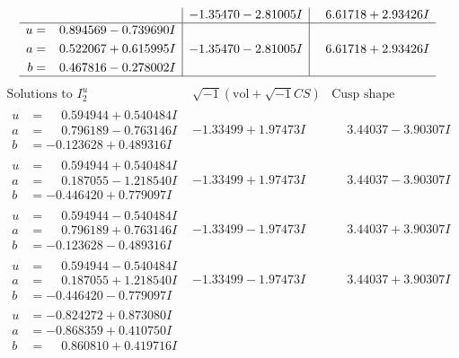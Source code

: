 \documentclass[1p]{elsarticle_modified}
\theoremstyle{definition}
\newcommand{\I}{\sqrt{-1}}
\begin{document}
$$\begin{array}{c|c|c}
 & -1.35470 - 2.81005 I & \phantom{-}6.61718 + 2.93426 I \\ \hline\begin{aligned}
u &= \phantom{-}0.894569 - 0.739690 I \\
a &= \phantom{-}0.522067 + 0.615995 I \\
b &= \phantom{-}0.467816 - 0.278002 I\end{aligned}
 & -1.35470 - 2.81005 I & \phantom{-}6.61718 + 2.93426 I\\
 \hline 
 \end{array}$$\newpage$$\begin{array}{c|c|c}  
\text{Solutions to }I^u_{2}& \I (\text{vol} + \sqrt{-1}CS) & \text{Cusp shape}\\
 \hline 
\begin{aligned}
u &= \phantom{-}0.594944 + 0.540484 I \\
a &= \phantom{-}0.796189 - 0.763146 I \\
b &= -0.123628 + 0.489316 I\end{aligned}
 & -1.33499 + 1.97473 I & \phantom{-}3.44037 - 3.90307 I \\ \hline\begin{aligned}
u &= \phantom{-}0.594944 + 0.540484 I \\
a &= \phantom{-}0.187055 - 1.218540 I \\
b &= -0.446420 + 0.779097 I\end{aligned}
 & -1.33499 + 1.97473 I & \phantom{-}3.44037 - 3.90307 I \\ \hline\begin{aligned}
u &= \phantom{-}0.594944 - 0.540484 I \\
a &= \phantom{-}0.796189 + 0.763146 I \\
b &= -0.123628 - 0.489316 I\end{aligned}
 & -1.33499 - 1.97473 I & \phantom{-}3.44037 + 3.90307 I \\ \hline\begin{aligned}
u &= \phantom{-}0.594944 - 0.540484 I \\
a &= \phantom{-}0.187055 + 1.218540 I \\
b &= -0.446420 - 0.779097 I\end{aligned}
 & -1.33499 - 1.97473 I & \phantom{-}3.44037 + 3.90307 I \\ \hline\begin{aligned}
u &= -0.824272 + 0.873080 I \\
a &= -0.868359 + 0.410750 I \\
b &= \phantom{-}0.860810 + 0.419716 I\end{aligned}

\end{array}$$
\end{document}
